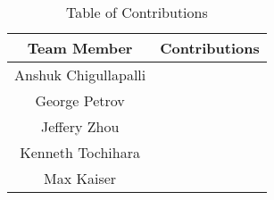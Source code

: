     \begin{table}[H]
        \centering
        \begin{tabular}{|c|c|}
            \hline
            \textbf{Team Member} & \textbf{Contributions}  \\ \hline
            Anshuk Chigullapalli & \\ \hline
            George Petrov & \\ \hline
            Jeffery Zhou & \\ \hline
            Kenneth Tochihara & \\ \hline
            Max Kaiser & \\ \hline
        \end{tabular}
        \caption{Table of Contributions}
        \label{tab:contributions}
    \end{table}
    
